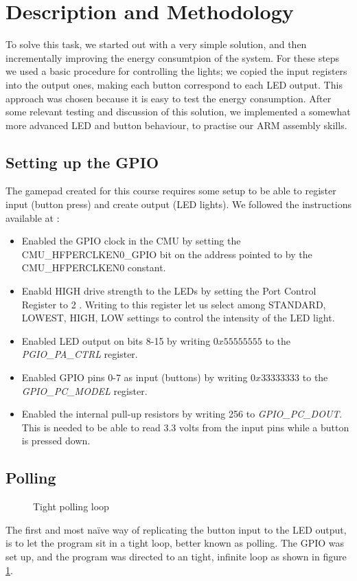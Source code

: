 \section{Description and Methodology}
\label{section:description_and_methodology}
To solve this task, we started out with a very simple solution, and then incrementally improving the energy consumtpion of the system. For these steps we used a basic procedure for controlling the lights; we copied the input registers into the output ones, making each button correspond to each LED output. This approach was chosen because it is easy to test the energy consumption. After some relevant testing and discussion of this solution, we implemented a somewhat more advanced LED and button behaviour, to practise our ARM assembly skills. 


	\subsection{Setting up the GPIO}
	\label{subsection:gpio_setup}
	The gamepad created for this course requires some setup to be able to register input (button press) and create output (LED lights). We followed the instructions available at \cite[p. 24]{compendium}:
	
	\begin{itemize}
		\item Enabled the GPIO clock in the CMU by setting the CMU\_HFPERCLKEN0\_GPIO bit on the address pointed to by the CMU\_HFPERCLKEN0 constant.
		\item Enabld HIGH drive strength to the LEDs by setting the Port Control Register to 2 \cite[p. 766]{reference_manual}. Writing to this register let us select among STANDARD, LOWEST, HIGH, LOW settings to control the intensity of the LED light.
		\item Enabled LED output on bits 8-15 by writing $0x55555555$ to the \emph{PGIO\_PA\_CTRL} register.
		\item Enabled GPIO pins 0-7 as input (buttons) by writing $0x33333333$ to the \emph{GPIO\_PC\_MODEL} register.
		\item Enabled the internal pull-up resistors by writing 256 to \emph{GPIO\_PC\_DOUT}. This is needed to be able to read 3.3 volts from the input pins while a button is pressed down.
	\end{itemize}

	\subsection{Polling}
	\label{subsection:polling}
	\begin{figure}[h]
		
		\caption{Tight polling loop}
		\label{code:polling_loop}
	\end{figure}
	The first and most naïve way of replicating the button input to the LED output, is to let the program sit in a tight loop, better known as polling. The GPIO was set up, and the program was directed to an tight, infinite loop as shown in figure \ref{code:polling_loop}.

